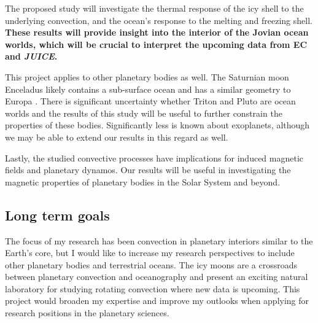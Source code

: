 \documentclass[12pt]{article}
\begin{document}
The proposed study will investigate the thermal response of the icy shell to the underlying convection, and the ocean's response to the melting and freezing shell. 
\textbf{These results will provide insight into the interior of the Jovian ocean worlds, which will be crucial to interpret the upcoming data from EC and \textit{JUICE}.}

This project applies to other planetary bodies as well. The Saturnian moon Enceladus likely contains a sub-surface ocean and has a similar geometry to Europa \citep{kS24}. There is significant uncertainty whether Triton \citep{jK22} and Pluto \citep{kS24} are ocean worlds and the results of this study will be useful to further constrain the properties of these bodies. 
Significantly less is known about exoplanets, although we may be able to extend our results in this regard as well.

Lastly, the studied convective processes have implications for induced magnetic fields and planetary dynamos. Our results will be useful in investigating the magnetic properties of planetary bodies in the Solar System and beyond.
%
\subsection{Long term goals}
The focus of my research has been convection in planetary interiors similar to the Earth's core, but I would like to increase my research perspectives to include other planetary bodies and terrestrial oceans. The icy moons are a crossroads between planetary convection and oceanography and present an exciting natural laboratory for studying rotating convection where new data is upcoming. This project would broaden my expertise and improve my outlooks when applying for research positions in the planetary sciences.

\begin{spacing}{0.4}

\printbibliography

\end{spacing}
\end{document}
